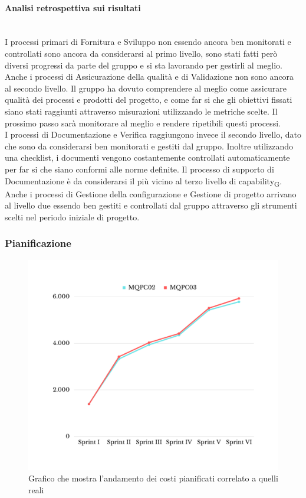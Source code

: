 \paragraph{Analisi retrospettiva sui risultati}\mbox{}\\
I processi primari di Fornitura e Sviluppo non essendo ancora ben monitorati e controllati sono ancora da considerarsi al primo livello, sono stati fatti però diversi progressi da parte del gruppo e si sta lavorando per gestirli al meglio.\\
Anche i processi di Assicurazione della qualità e di Validazione non sono ancora al secondo livello. Il gruppo ha dovuto comprendere al meglio come assicurare qualità dei processi e prodotti del progetto, e come far si che gli obiettivi fissati siano stati raggiunti attraverso misurazioni utilizzando le metriche scelte. Il prossimo passo sarà monitorare al meglio e rendere ripetibili questi processi.\\
I processi di Documentazione e Verifica raggiungono invece il secondo livello, dato che sono da considerarsi ben monitorati e gestiti dal gruppo. Inoltre utilizzando una checklist, i documenti vengono costantemente controllati automaticamente per far si che siano conformi alle norme definite. Il processo di supporto di Documentazione è da considerarsi il più vicino al terzo livello di capability\textsubscript{G}.\\
Anche i processi di Gestione della configurazione e Gestione di progetto arrivano al livello due essendo ben gestiti e controllati dal gruppo attraverso gli strumenti scelti nel periodo iniziale di progetto.
\subsubsection{Pianificazione}
\begin{figure}[H]
	\centering
	\includegraphics[scale=0.5]{img/BCWS-ACWS.png}
	\caption{Grafico che mostra l'andamento dei costi pianificati correlato a quelli reali}
\end{figure}
